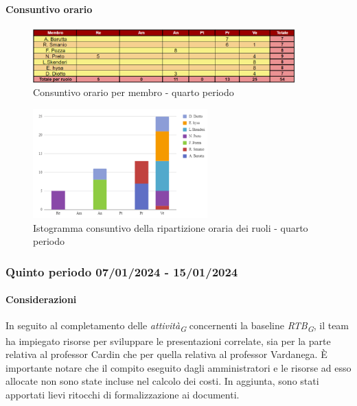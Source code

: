 \paragraph{Consuntivo orario } \hspace{1pt}

\begin{figure}[H]
    \centering
    \includegraphics[width=0.9\textwidth]{../Images/consuntivoOrario4Periodo.png}
    \caption{Consuntivo orario per membro - quarto periodo}
    \label{fig:Constuntivo_orario_4}
\end{figure}

\begin{figure}[H]
    \centering
    \includegraphics[width=0.6\textwidth]{../Images/consuntivoDivisioneRuoli4Periodo.png}
    \caption{Istogramma consuntivo della ripartizione oraria dei ruoli - quarto periodo}
    \label{fig:Consuntivo_ripartizione_oraria_4}
\end{figure}



\subsubsection{Quinto periodo  07/01/2024 - 15/01/2024}
\paragraph{Considerazioni}
In seguito al completamento delle \textit{attività}\textsubscript{\textit{G}} concernenti la baseline \textit{RTB}\textsubscript{\textit{G}}, il team ha impiegato risorse per sviluppare le presentazioni correlate, sia per la parte relativa al professor Cardin che per quella relativa al professor Vardanega.
È importante notare che il compito eseguito dagli amministratori e le risorse ad esso allocate non sono state incluse nel calcolo dei costi. 
In aggiunta, sono stati apportati lievi ritocchi di formalizzazione ai documenti.

